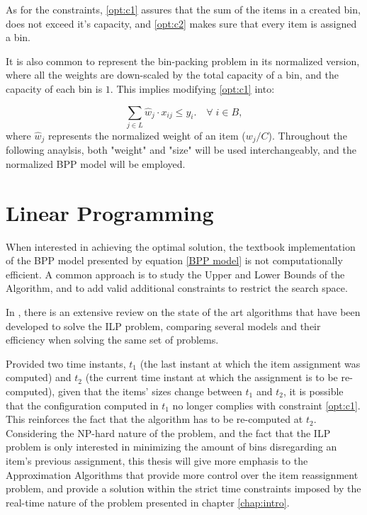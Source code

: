 As for the constraints, \ref{opt:c1} assures that the sum of the items in a
created bin, does not exceed it's capacity, and \ref{opt:c2} makes sure that every
item is assigned a bin. 

It is also common to represent the bin-packing problem in its normalized
version, where all the weights are down-scaled by the total capacity of a bin,
and the capacity of each bin is $1$. This implies modifying \ref{opt:c1} into:

\begin{equation}
    \sum_{j \in L} \hat w_j \cdot x_{ij} \leq y_i. \quad \forall \; i \in B,
\end{equation}
where \(\hat w_j\) represents the normalized weight of an item ($w_j/C$).
Throughout the following anaylsis, both "weight" and "size" will be used
interchangeably, and the normalized BPP model will be employed.

\section{Linear Programming}

When interested in achieving the optimal solution, the textbook implementation
of the BPP model presented by equation \ref{BPP model} is not computationally
efficient. A common approach is to study the Upper and Lower Bounds of the
Algorithm, and to add valid additional constraints to restrict the search space.

In \cite{delorme2016bin}, there is an extensive review on the state of the art
algorithms that have been developed to solve the ILP problem, comparing several
models and their efficiency when solving the same set of problems. 

Provided two time instants, $t_1$ (the last instant at which the item assignment
was computed) and $t_2$ (the current time instant at which the assignment is to
be re-computed), given that the items' sizes change between $t_1$ and $t_2$, it
is possible that the configuration computed in $t_1$ no longer complies with
constraint \ref{opt:c1}. This reinforces the fact that the algorithm has to be
re-computed at $t_2$. Considering the NP-hard nature of the problem, and the
fact that the ILP problem is only interested in minimizing the amount of bins
disregarding an item's previous assignment, this thesis will give more emphasis
to the Approximation Algorithms that provide more control over the item
reassignment problem, and provide a solution within the strict time constraints
imposed by the real-time nature of the problem presented in chapter
\ref{chap:intro}.

